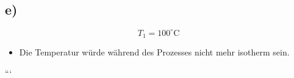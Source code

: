 

\subsection*{e)}
\begin{equation*}
T_1 = 100^\circ \text{C}
\end{equation*}
\begin{itemize}
    \item Die Temperatur würde während des Prozesses nicht mehr isotherm sein.
\end{itemize}

```